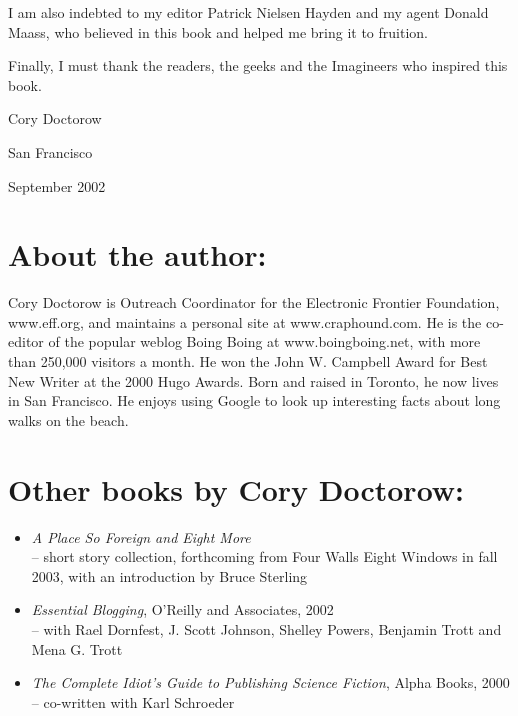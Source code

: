 I am also indebted to my editor Patrick Nielsen Hayden and my agent
Donald Maass, who believed in this book and helped me bring it to
fruition.

Finally, I must thank the readers, the geeks and the Imagineers who
inspired this book.

Cory Doctorow

San Francisco

September 2002

\section{About the author:}

Cory Doctorow is Outreach Coordinator for the Electronic Frontier
Foundation, www.eff.org, and maintains a personal site at
www.craphound.com. He is the co-editor of the popular weblog Boing
Boing at www.boingboing.net, with more than 250,000 visitors a
month. He won the John W. Campbell Award for Best New Writer at the
2000 Hugo Awards. Born and raised in Toronto, he now lives in San
Francisco. He enjoys using Google to look up interesting facts
about long walks on the beach.

\section{Other books by Cory Doctorow:}
\begin{itemize}
\item
\emph{A Place So Foreign and Eight More}\\– short story collection,
forthcoming from Four Walls Eight Windows in fall 2003, with an
introduction by Bruce Sterling
\item
\emph{Essential Blogging}, O'Reilly and Associates, 2002\\– with
Rael Dornfest, J. Scott Johnson, Shelley Powers, Benjamin Trott and
Mena G. Trott
\item
\emph{The Complete Idiot's Guide to Publishing Science Fiction},
Alpha Books, 2000\\– co-written with Karl Schroeder
\end{itemize}


